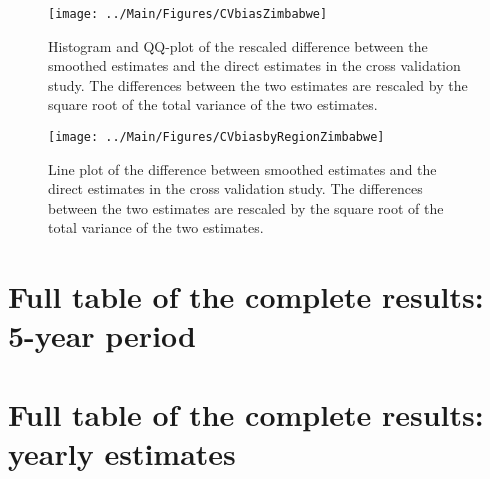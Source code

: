 \documentclass[12pt]{article}\usepackage[]{graphicx}\usepackage[]{color}
\newenvironment{knitrout}{}{} %
\begin{document}
\begin{knitrout}
\color{fgcolor}\begin{figure}[bht]

{\centering \texttt{[image: ../Main/Figures/CVbiasZimbabwe]} 

}

\caption[Histogram and QQ-plot of the rescaled difference between the smoothed estimates and the direct estimates in the cross validation study]{Histogram and QQ-plot of the rescaled difference between the smoothed estimates and the direct estimates in the cross validation study. The differences between the two estimates are rescaled by the square root of the total variance of the two estimates.}\label{fig:unnamed-chunk-349}
\end{figure}


\end{knitrout}

\begin{knitrout}
\color{fgcolor}\begin{figure}[bht]

{\centering \texttt{[image: ../Main/Figures/CVbiasbyRegionZimbabwe]} 

}

\caption[Line plot of the difference between smoothed estimates and the direct estimates in the cross validation study]{Line plot of the difference between smoothed estimates and the direct estimates in the cross validation study. The differences between the two estimates are rescaled by the square root of the total variance of the two estimates.}\label{fig:unnamed-chunk-350}
\end{figure}


\end{knitrout}


% 
\clearpage
\section{Full table of the complete results: 5-year period}
{\scriptsize

}

\clearpage
\section{Full table of the complete results: yearly estimates}
{\scriptsize

}
\end{document}
